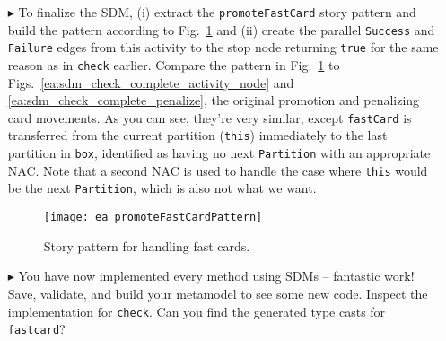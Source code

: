 \begin{itemize}
\item[$\blacktriangleright$] To finalize the SDM, (i) extract the \texttt{promoteFastCard} story pattern and build the pattern according to
Fig.~\ref{ea:promoteFastCardPattern} and (ii) create the parallel \texttt{Success} and \texttt{Failure} edges from this activity to the stop node returning 
\texttt{true} for the same reason as in \texttt{check} earlier. Compare the pattern in Fig.~\ref{ea:promoteFastCardPattern} to Figs.~\ref{ea:sdm_check_complete_activity_node} and \ref{ea:sdm_check_complete_penalize}, the
original promotion and penalizing card movements. As you can see, they're very similar, except \texttt{fastCard} is transferred from the current partition
(\texttt{this}) immediately to the last partition in \texttt{box}, identified as having no next \texttt{Partition} with an appropriate NAC.
Note that a second NAC is used to handle the case where \texttt{this} would be the next \texttt{Partition}, which is also not what we want.

\begin{figure}[htbp] 
\begin{center}
  \texttt{[image: ea\_promoteFastCardPattern]}
  \caption{Story pattern for handling fast cards.}  
  \label{ea:promoteFastCardPattern}
\end{center}
\end{figure}

\item[$\blacktriangleright$] You have now implemented every method using SDMs -- fantastic work! Save, validate, and build your metamodel to see some new code.
Inspect the implementation for \texttt{check}.  Can you find the generated type casts for \texttt{fastcard}?

\end{itemize}
